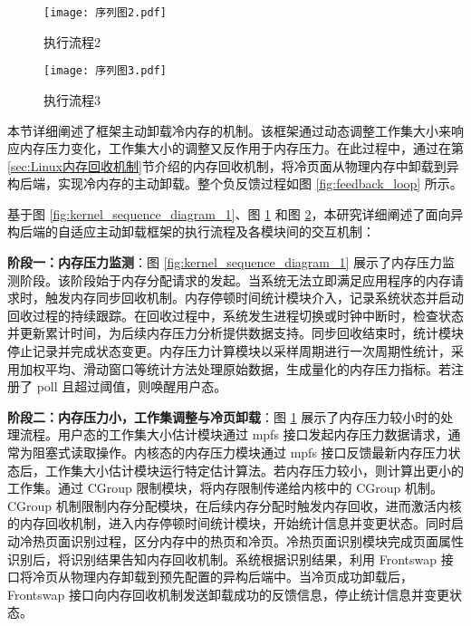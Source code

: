 \begin{figure}[h]
\centering
\texttt{[image: 序列图2.pdf]}
\caption{执行流程2}
\label{fig:kernel_sequence_diagram_2}
\end{figure}

\begin{figure}[h]
\centering
\texttt{[image: 序列图3.pdf]}
\caption{执行流程3}
\label{fig:kernel_sequence_diagram_3}
\end{figure}

本节详细阐述了框架主动卸载冷内存的机制。该框架通过动态调整工作集大小来响应内存压力变化，工作集大小的调整又反作用于内存压力。在此过程中，通过在第\ref{sec:Linux内存回收机制}节介绍的内存回收机制，将冷页面从物理内存中卸载到异构后端，实现冷内存的主动卸载。整个负反馈过程如图 \ref{fig:feedback_loop} 所示。

基于图 \ref{fig:kernel_sequence_diagram_1}、图 \ref{fig:kernel_sequence_diagram_2} 和图 \ref{fig:kernel_sequence_diagram_3}，本研究详细阐述了面向异构后端的自适应主动卸载框架的执行流程及各模块间的交互机制：

\textbf{阶段一：内存压力监测}：图 \ref{fig:kernel_sequence_diagram_1} 展示了内存压力监测阶段。该阶段始于内存分配请求的发起。当系统无法立即满足应用程序的内存请求时，触发内存同步回收机制。内存停顿时间统计模块介入，记录系统状态并启动回收过程的持续跟踪。在回收过程中，系统发生进程切换或时钟中断时，检查状态并更新累计时间，为后续内存压力分析提供数据支持。同步回收结束时，统计模块停止记录并完成状态变更。内存压力计算模块以采样周期进行一次周期性统计，采用加权平均、滑动窗口等统计方法处理原始数据，生成量化的内存压力指标。若注册了 poll 且超过阈值，则唤醒用户态。

\textbf{阶段二：内存压力小，工作集调整与冷页卸载}：图 \ref{fig:kernel_sequence_diagram_2} 展示了内存压力较小时的处理流程。用户态的工作集大小估计模块通过 mpfs 接口发起内存压力数据请求，通常为阻塞式读取操作。内核态的内存压力模块通过 mpfs 接口反馈最新内存压力状态后，工作集大小估计模块运行特定估计算法。若内存压力较小，则计算出更小的工作集。通过  CGroup  限制模块，将内存限制传递给内核中的  CGroup  机制。 CGroup  机制限制内存分配模块，在后续内存分配时触发内存回收，进而激活内核的内存回收机制，进入内存停顿时间统计模块，开始统计信息并变更状态。同时启动冷热页面识别过程，区分内存中的热页和冷页。冷热页面识别模块完成页面属性识别后，将识别结果告知内存回收机制。系统根据识别结果，利用 Frontswap 接口将冷页从物理内存卸载到预先配置的异构后端中。当冷页成功卸载后，Frontswap 接口向内存回收机制发送卸载成功的反馈信息，停止统计信息并变更状态。

